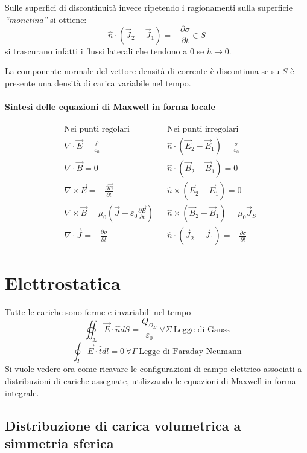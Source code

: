 Sulle superfici di discontinuità invece ripetendo i ragionamenti sulla superficie \textit{``monetina''}
si ottiene:
$$
\hat{n}\cdot\left(\vec{J}_2-\vec{J}_1\right) = -\frac{\partial\sigma}{\partial t} \in S
$$
si trascurano infatti i flussi laterali che tendono a 0 se $h\to 0$.

La componente normale del vettore densità di corrente è discontinua se su $S$ è presente una densità
di carica variabile nel tempo.

\paragraph{Sintesi delle equazioni di Maxwell in forma locale} 
\begin{align*}
&\text{Nei punti}\text{ regolari}  & &\text{Nei punti}\text{ irreg}\text{olari}\\
&\nabla\cdot\vec{E} = \frac{\rho}{\varepsilon_0} & &\hat{n}\cdot(\vec{E}_2-\vec{E}_1) = \frac{\sigma}{\varepsilon_0}\\
&\nabla\cdot\vec{B} = 0 & &\hat{n}\cdot(\vec{B}_2-\vec{B}_1) = 0\\
&\nabla\times\vec{E} = -\frac{\partial\vec{B}}{\partial t}& &\hat{n}\times(\vec{E}_2-\vec{E}_1) = 0\\
&\nabla\times\vec{B} = \mu_0\left(\vec{J} + \varepsilon_0\frac{\partial\vec{E}}{\partial t}\right)& &\hat{n}\times(\vec{B}_2-\vec{B}_1) = \mu_0\vec{J}_S \\
&\nabla\cdot\vec{J} = -\frac{\partial\rho}{\partial t} & &\hat{n}\cdot(\vec{J}_2-\vec{J}_1) = -\frac{\partial \sigma}{\partial t}
\end{align*}

\section{Elettrostatica}
Tutte le cariche sono ferme e invariabili nel tempo
$$
\oiint_\Sigma \vec{E}\cdot\hat{n}dS = \frac{Q_{\Omega_\Sigma}}{\varepsilon_0}\ \forall\Sigma\ \text{Legge di Gauss}
$$
$$
\oint_\Gamma \vec{E}\cdot\hat{t}dl = 0 \ \forall\Gamma\ \text{Legge di Faraday-Neumann}
$$
Si vuole vedere ora come ricavare le configurazioni di campo elettrico associati a distribuzioni
di cariche assegnate, utilizzando le equazioni di Maxwell in forma integrale.

\subsection{Distribuzione di carica volumetrica a simmetria sferica}


